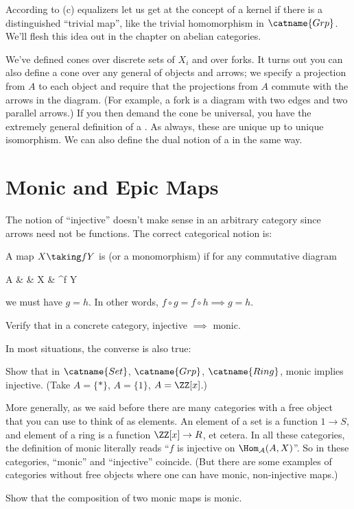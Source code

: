 According to (c) equalizers let us get at the concept of a kernel if there is a distinguished
``trivial map'', like the trivial homomorphism in $\catname{Grp}$.
We'll flesh this idea out in the chapter on abelian categories.

\begin{remark}
	We've defined cones over discrete sets of $X_i$ and over forks.
	It turns out you can also define a cone over any general  of objects and arrows;
	we specify a projection from $A$ to each object and
	require that the projections from $A$ commute with the arrows in the diagram.
	(For example, a fork is a diagram with two edges and two parallel arrows.)
	If you then demand the cone be universal, you have the extremely general definition of a .
	As always, these are unique up to unique isomorphism.
	We can also define the dual notion of a  in the same way.
\end{remark}

\section{Monic and Epic Maps}
The notion of ``injective'' doesn't make sense in an arbitrary category since arrows need not be functions.
The correct categorical notion is:
\begin{definition}
	A map $X \taking f Y$ is  (or a monomorphism) if for any commutative diagram
	\begin{diagram}
		A &  & X & \rTo^f Y 
	\end{diagram}
	we must have $g = h$.
	In other words, $f \circ g = f \circ h \implies g = h$.
\end{definition}
\begin{ques}
	Verify that in a concrete category,
	injective $\implies$ monic.
\end{ques}
In most situations, the converse is also true:
\begin{exercise}
	Show that in $\catname{Set}$, $\catname{Grp}$, $\catname{Ring}$,
	monic implies injective. (Take $A = \{\ast\}$, $A = \{1\}$, $A = \ZZ[x]$.)
\end{exercise}
More generally, as we said before there are many categories
with a free object that you can use to think of as elements.
An element of a set is a function $1 \to S$, and element of a ring is a function $\ZZ[x] \to R$, et cetera.
In all these categories, the definition of monic literally reads ``$f$ is injective on $\Hom_\AA(A, X)$''.
So in these categories, ``monic'' and ``injective'' coincide.
(But there are some examples of categories without free objects where one can have monic,
non-injective maps.)
\begin{ques}
	Show that the composition of two monic maps is monic.
\end{ques}

